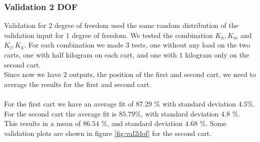 \subsubsection{Validation 2 DOF}
Validation for $2$ degree of freedom used the same random distribution of the validation input for $1$ degree of freedom. We tested the combination $K_h,K_m$ and $K_l,K_h$. For each combination we made $3$ tests, one without any load on the two carts, one with half kilogram on  each cart, and one with $1$ kilogram only on the second cart.\\ Since now we have $2$ outputs, the position of the first and second cart, we need to average the results for the first and second cart. \\ \\
For the first cart we have an average fit of $87.29$ \% with standard deviation $4.5$\%. For the second cart the average fit is $85.79\%$, with standard deviation $4.8$ \%.\\ This results in a mean of $86.54$ \%, and standard deviation $4.68$ \%. Some validation plots are shown in figure \ref{fig:val2dof} for the second cart.
